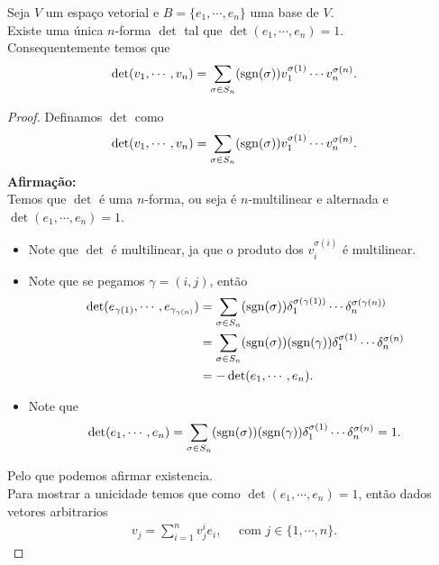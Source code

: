 \begin{theorem}
  Seja $V$ um espaço vetorial e $B=\{e_1,\cdots,e_n\}$ uma base de $V$.\\
  Existe uma única $n$-forma $\det$ tal que $\det(e_1,\cdots,e_n)=1$.\\
  Consequentemente temos que
  \begin{align*}
    \det(v_1,\cdots,v_n)=\sum_{\sigma\in S_n}(\operatorname{sgn}(\sigma))v_1^{\sigma(1)}\cdots v_{n}^{\sigma(n)}.
  \end{align*}
\end{theorem}
\begin{proof}
  Definamos $\det$ como
  \begin{align*}
    \det(v_1,\cdots,v_n)=\sum_{\sigma\in S_n}(\operatorname{sgn}(\sigma))v_1^{\sigma(1)}\cdots v_{n}^{\sigma(n)}.
  \end{align*}
  \textbf{Afirmação:}\\
  Temos que $\det$ é uma $n$-forma, ou seja é $n$-multilinear e alternada e $\det(e_1,\cdots,e_n)=1$.
  \begin{itemize}
    \item Note que $\det$ é multilinear, ja que o produto dos $v_i^{\sigma(i)}$ é multilinear.
    \item Note que se pegamos $\gamma=(i,j)$, então
      \begin{align*}
        \det(e_{\gamma(1)},\cdots,e_{\gamma_{\gamma(n)}})&=\sum_{\sigma\in S_n}(\operatorname{sgn}(\sigma))\delta_{1}^{\sigma(\gamma(1))}\cdots\delta_{n}^{\sigma(\gamma(n))}\\
        &=\sum_{\sigma\in S_n}(\operatorname{sgn}(\sigma))(\operatorname{sgn}(\gamma))\delta_{1}^{\sigma(1)}\cdots\delta_{n}^{\sigma(n)}\\
        &=-\det(e_1,\cdots,e_n).
      \end{align*}
    \item Note que
      \begin{align*}
        \det(e_1,\cdots,e_n)=\sum_{\sigma\in S_n}(\operatorname{sgn}(\sigma))(\operatorname{sgn}(\gamma))\delta_{1}^{\sigma(1)}\cdots\delta_{n}^{\sigma(n)}=1.
      \end{align*}
  \end{itemize}
  Pelo que podemos afirmar existencia.\\
  Para mostrar a unicidade temos que como $\det(e_1,\cdots,e_n)=1$, então dados vetores arbitrarios
  \begin{align*}
    v_j=\sum_{i=1}^{n}v_j^{i}e_i,\quad\text{ com }j\in\{1,\cdots,n\}.
  \end{align*}

\end{proof}
